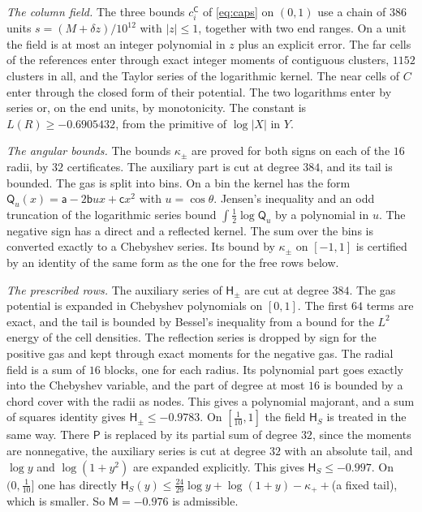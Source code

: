 \documentclass[11pt]{amsart}
\theoremstyle{definition}
\theoremstyle{remark}
\numberwithin{equation}{section}
\begin{document}
\emph{The column field.} The three bounds $c^{\mathsf C}_i$ of \eqref{eq:caps} on $(0,1)$ use a chain of $386$ units $s=(M+\delta z)/10^{12}$ with $|z|\le1$, together with two end ranges. On a unit the field is at most an integer polynomial in $z$ plus an explicit
error. The far cells of the references enter through exact integer moments of contiguous clusters, $1152$ clusters in all, and the Taylor series of the logarithmic kernel. The near cells of $C$ enter through the closed form of their potential. The two logarithms enter by
series or, on the end units, by monotonicity. The constant is $L(R)\ge-0.6905432$, from the primitive of $\log|X|$ in $Y$.

\emph{The angular bounds.} The bounds $\kappa_\pm$ are proved for both signs on each of the $16$ radii, by $32$ certificates. The auxiliary part is cut at degree $384$, and its tail is bounded. The gas is split into bins. On a bin the kernel has the form
$\mathsf Q_u(x)=\mathsf a-2\mathsf bux+\mathsf cx^2$ with $u=\cos\theta$. Jensen's inequality and an odd truncation of the logarithmic series bound $\int\frac12\log\mathsf Q_u$ by a polynomial in $u$. The negative sign has a direct and a reflected kernel. The sum over the bins
is converted exactly to a Chebyshev series. Its bound by $\kappa_\pm$ on $[-1,1]$ is certified by an identity of the same form as the one for the free rows below.

\emph{The prescribed rows.} The auxiliary series of $\mathsf H_\pm$ are cut at degree $384$. The gas potential is expanded in Chebyshev polynomials on $[0,1]$. The first $64$ terms are exact, and the tail is bounded by Bessel's inequality from a bound for the $L^2$ energy of the cell densities.
The reflection series is dropped by sign for the positive gas and kept through exact moments for the negative gas. The radial field is a sum of $16$ blocks, one for each radius. Its polynomial part goes exactly into the Chebyshev variable, and the part of degree at most $16$ is bounded by
a chord cover with the radii as nodes. This gives a polynomial majorant, and a sum of squares identity gives $\mathsf H_\pm\le-0.9783$. On $[\frac1{10},1]$ the field $\mathsf H_S$ is treated in the same way. There $\mathsf P$ is replaced by its partial sum of degree $32$, since the moments are nonnegative, the auxiliary series is cut at degree $32$ with an absolute tail, and
$\log y$ and $\log(1+y^2)$ are expanded explicitly. This gives $\mathsf H_S\le-0.997$. On $(0,\frac1{10}]$ one has directly $\mathsf H_S(y)\le\frac{24}{29}\log y+\log(1+y)-\kappa_++$(a fixed tail), which is smaller. So $\mathsf M=-0.976$ is admissible.
\end{document}
